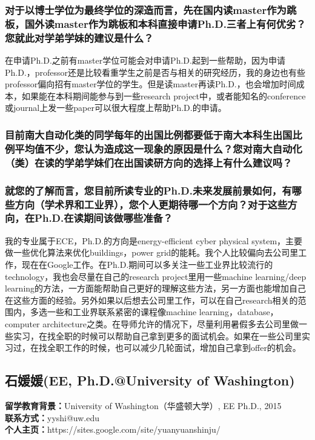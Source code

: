 \documentclass[a4paper,UTF8]{book}
\begin{document}
    \subsubsection*{对于以博士学位为最终学位的深造而言，先在国内读master作为跳板，国外读master作为跳板和本科直接申请Ph.D.三者上有何优劣？您就此对学弟学妹的建议是什么？}
    在申请Ph.D.之前有master学位可能会对申请Ph.D.起到一些帮助，因为申请Ph.D.，professor还是比较看重学生之前是否与相关的研究经历，我的身边也有些professor偏向招有master学位的学生。但是读master再读Ph.D.，也会增加时间成本，如果能在本科期间能参与到一些research project中，或者能知名的conference或journal上发一些paper可以很大程度上帮助Ph.D.的申请。

    \subsubsection*{目前南大自动化类的同学每年的出国比例都要低于南大本科生出国比例平均值不少，您认为造成这一现象的原因是什么？您对南大自动化（类）在读的学弟学妹们在出国读研方向的选择上有什么建议吗？}

    \subsubsection*{就您的了解而言，您目前所读专业的Ph.D.未来发展前景如何，有哪些方向（学术界和工业界），您个人更期待哪一个方向？对于这些方向，在Ph.D.在读期间该做哪些准备？}
    我的专业属于ECE，Ph.D.的方向是energy-efficient cyber physical system，主要做一些优化算法来优化buildings，power grid的能耗。我个人比较偏向去公司里工作，现在在Google工作。在Ph.D.期间可以多关注一些工业界比较流行的technology，我也会尽量在自己的research project里用一些machine learning/deep learning的方法，一方面能帮助自己更好的理解这些方法，另一方面也能增加自己在这些方面的经验。另外如果以后想去公司里工作，可以在自己research相关的范围内，多选一些和工业界联系紧密的课程像machine learning，database，computer architecture之类。在导师允许的情况下，尽量利用暑假多去公司里做一些实习，在找全职的时候可以帮助自己拿到更多的面试机会。如果在一些公司里实习过，在找全职工作的时候，也可以减少几轮面试，增加自己拿到offer的机会。


\clearpage
\subsection{石媛媛(EE, Ph.D.@University of Washington)}
    \textbf{留学教育背景：}University of Washington（华盛顿大学）, EE Ph.D., 2015\\
    \textbf{联系方式：}yyshi@uw.edu\\
    \textbf{个人主页：}https://sites.google.com/site/yuanyuanshinju/
\end{document}
